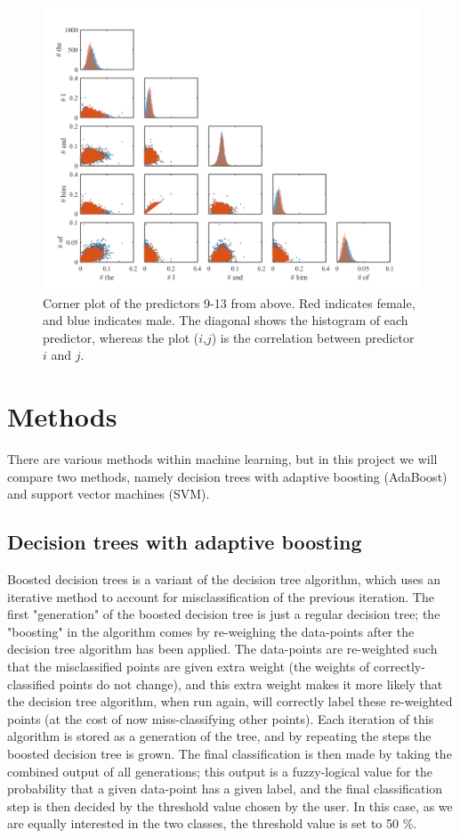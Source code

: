 \documentclass[a4paper,11pt]{article}
\begin{document}
\begin{figure}[h!]
    \centerline{\includegraphics[width=1\textwidth]{Pix/Corner_word.png}}
    \caption{Corner plot of the predictors 9-13 from above. Red indicates female, and blue indicates male. The diagonal shows the histogram of each predictor, whereas the plot ($i$,$j$) is the correlation between predictor $i$ and $j$.}
    \label{fig:Corner_word}
\end{figure}
\FloatBarrier
\section{Methods}
\noindent There are various methods within machine learning, but in this project we will compare two methods, namely decision trees with adaptive boosting (AdaBoost) and support vector machines (SVM).

\subsection{Decision trees with adaptive boosting}
Boosted decision trees is a variant of the decision tree algorithm, which uses an iterative method to account for misclassification of the previous iteration.
The first "generation" of the boosted decision tree is just a regular decision tree; the "boosting" in the algorithm comes by re-weighing the data-points after the decision tree algorithm has been applied. The data-points are re-weighted such that the misclassified points are given extra weight (the weights of correctly-classified points do not change), and this extra weight makes it more likely that the decision tree algorithm, when run again, will correctly label these re-weighted points (at the cost of now miss-classifying other points). Each iteration of this algorithm is stored as a generation of the tree, and by repeating the steps the boosted decision tree is grown. The final classification is then made by taking the combined output of all generations; this output is a fuzzy-logical value for the probability that a given data-point has a given label, and the final classification step is then decided by the threshold value chosen by the user.
\noindent In this case, as we are equally interested in the two classes, the threshold value is set to 50 \%.
\end{document}
